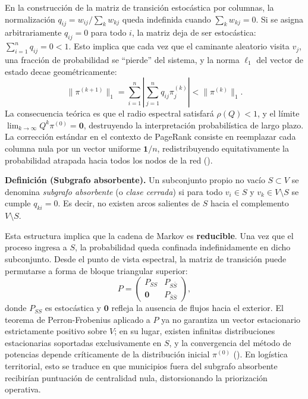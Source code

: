 \documentclass[
  spanish,
  us-letterpaper,
]{scrreprt}
\numberwithin{equation}{section}
\begin{document}
En la construcción de la matriz de transición estocástica por columnas,
la normalización \(q_{ij} = w_{ij} / \sum_k w_{kj}\) queda indefinida
cuando \(\sum_k w_{kj} = 0\). Si se asigna arbitrariamente
\(q_{ij} = 0\) para todo \(i\), la matriz deja de ser estocástica:
\(\sum_{i=1}^n q_{ij} = 0 < 1\). Esto implica que cada vez que el
caminante aleatorio visita \(v_j\), una fracción de probabilidad se
``pierde'' del sistema, y la norma \(\ell_1\) del vector de estado decae
geométricamente: \[
\|\pi^{(k+1)}\|_1 = \sum_{i=1}^n \left| \sum_{j=1}^n q_{ij} \pi_j^{(k)} \right| < \|\pi^{(k)}\|_1.
\] La consecuencia teórica es que el radio espectral satisfará
\(\rho(Q) < 1\), y el límite
\(\lim_{k \to \infty} Q^k \pi^{(0)} = \mathbf{0}\), destruyendo la
interpretación probabilística de largo plazo. La corrección estándar en
el contexto de PageRank consiste en reemplazar cada columna nula por un
vector uniforme \(\mathbf{1}/n\), redistribuyendo equitativamente la
probabilidad atrapada hacia todos los nodos de la red
().

\textbf{Definición (Subgrafo absorbente).} Un subconjunto propio no
vacío \(S \subset V\) se denomina \emph{subgrafo absorbente} (o
\emph{clase cerrada}) si para todo \(v_i \in S\) y
\(v_k \in V \setminus S\) se cumple \(q_{ki} = 0\). Es decir, no existen
arcos salientes de \(S\) hacia el complemento \(V \setminus S\).

Esta estructura implica que la cadena de Markov es \textbf{reducible}.
Una vez que el proceso ingresa a \(S\), la probabilidad queda confinada
indefinidamente en dicho subconjunto. Desde el punto de vista espectral,
la matriz de transición puede permutarse a forma de bloque triangular
superior: \[
P = \begin{pmatrix}
P_{SS} & P_{S\bar{S}} \\
\mathbf{0} & P_{\bar{S}\bar{S}}
\end{pmatrix},
\] donde \(P_{SS}\) es estocástica y \(\mathbf{0}\) refleja la ausencia
de flujos hacia el exterior. El teorema de Perron-Frobenius aplicado a
\(P\) ya no garantiza un vector estacionario estrictamente positivo
sobre \(V\); en su lugar, existen infinitas distribuciones estacionarias
soportadas exclusivamente en \(S\), y la convergencia del método de
potencias depende críticamente de la distribución inicial \(\pi^{(0)}\)
(). En logística territorial,
esto se traduce en que municipios fuera del subgrafo absorbente
recibirían puntuación de centralidad nula, distorsionando la
priorización operativa.
\end{document}

